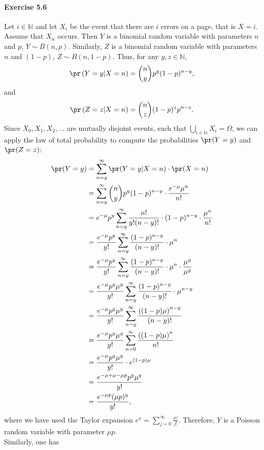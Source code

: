 \paragraph{Exercise 5.6}
Let $i \in \mathbb{N}$ and let $X_i$ be the event that there are $i$ errors on a
page, that is $X = i$. Assume that $X_n$ occurs. Then $Y$ is a binomial random
variable with parameters $n$ and $p$, $Y \sim B(n,p)$. Similarly, $Z$ is a binomial
random variable with parameters $n$ and $(1-p)$, $Z \sim B(n,1-p)$.
Thus, for any $y,z \in \mathbb{N}$,
\[ \pr\left(Y = y | X = n\right) = \binom{n}{y} p^y (1-p)^{n-y}, \]
and
\[ \pr\left(Z = z | X = n\right) = \binom{n}{z} (1-p)^z p^{n-z}. \]
Since $X_0, X_1, X_2, ...$ are mutually disjoint events, such that
$\bigcup_{i \in \mathbb{N}} X_i = \Omega$, we can apply the law of total probability
to compute the probabilities $\pr(Y = y)$ and $\pr(Z = z)$:
\begin{align*}
  \pr(Y = y)
    &= \sum_{n = y}^{\infty} \pr(Y = y | X = n) \cdot \pr(X = n) \\
    &= \sum_{n = y}^{\infty} \binom{n}{y} p^y (1-p)^{n-y} \cdot \frac{e^{-\mu}\mu^n}{n!} \\
    &= e^{-\mu} p^y \sum_{n = y}^{\infty} \frac{n!}{y!(n-y)!} \cdot (1-p)^{n-y} \cdot \frac{\mu^n}{n!} \\
    &= \frac{e^{-\mu} p^y}{y!} \sum_{n = y}^{\infty} \frac{(1-p)^{n-y}}{(n-y)!} \cdot \mu^n \\
    &= \frac{e^{-\mu} p^y}{y!} \sum_{n = y}^{\infty} \frac{(1-p)^{n-y}}{(n-y)!} \cdot \mu^n \cdot \frac{\mu^y}{\mu^y} \\
    &= \frac{e^{-\mu} p^y \mu^y}{y!} \sum_{n = y}^{\infty} \frac{(1-p)^{n-y}}{(n-y)!} \cdot \mu^{n-y} \\
    &= \frac{e^{-\mu} p^y \mu^y}{y!} \sum_{n = y}^{\infty} \frac{\left((1-p)\mu\right)^{n-y}}{(n-y)!} \\
    &= \frac{e^{-\mu} p^y \mu^y}{y!} \sum_{n = 0}^{\infty} \frac{\left((1-p)\mu\right)^{n}}{n!} \\
    &= \frac{e^{-\mu} p^y \mu^y}{y!} \cdot e^{(1-p)\mu} \\
    &= \frac{e^{-\mu + \mu - \mu p} p^y \mu^y}{y!} \\
    &= \frac{e^{- \mu p} (\mu p)^y}{y!}, \\
\end{align*}
where we have used the Taylor expansion $e^x = \sum_{j=0}^\infty \frac{x^j}{j!}$.
Therefore, $Y$ is a Poisson random variable with parameter $\mu p$. \\
Similarly, one has
